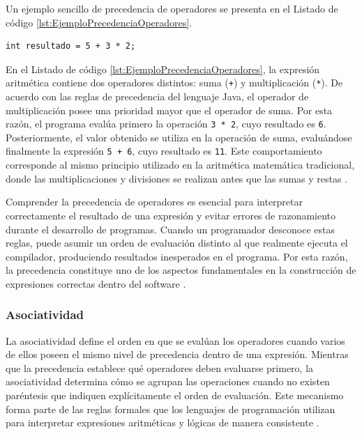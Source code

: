 \documentclass[12pt,twoside]{book}
\begin{document}
						Un ejemplo sencillo de precedencia de operadores se presenta en el Listado de código \ref{lst:EjemploPrecedenciaOperadores}.
						
						\begin{lstlisting}[style=Java,caption={Evaluación de una expresión considerando la precedencia de operadores.},label={lst:EjemploPrecedenciaOperadores}]
	int resultado = 5 + 3 * 2; \end{lstlisting}
						
						\noindent
						En el Listado de código \ref{lst:EjemploPrecedenciaOperadores}, la expresión aritmética contiene dos operadores distintos: suma (\texttt{+}) y multiplicación (\texttt{*}). De acuerdo con las reglas de precedencia del lenguaje Java, el operador de multiplicación posee una prioridad mayor que el operador de suma. Por esta razón, el programa evalúa primero la operación \texttt{3 * 2}, cuyo resultado es \texttt{6}. Posteriormente, el valor obtenido se utiliza en la operación de suma, evaluándose finalmente la expresión \texttt{5 + 6}, cuyo resultado es \texttt{11}. Este comportamiento corresponde al mismo principio utilizado en la aritmética matemática tradicional, donde las multiplicaciones y divisiones se realizan antes que las sumas y restas \cite{Sebesta2018Concepts}.
						
						Comprender la precedencia de operadores es esencial para interpretar correctamente el resultado de una expresión y evitar errores de razonamiento durante el desarrollo de programas. Cuando un programador desconoce estas reglas, puede asumir un orden de evaluación distinto al que realmente ejecuta el compilador, produciendo resultados inesperados en el programa. Por esta razón, la precedencia constituye uno de los aspectos fundamentales en la construcción de expresiones correctas dentro del software \cite{Pressman2019Software,Sommerville2015Software}.
						
					\subsubsection{Asociatividad}
						\noindent
						La asociatividad define el orden en que se evalúan los operadores cuando varios de ellos poseen el mismo nivel de precedencia dentro de una expresión. Mientras que la precedencia establece qué operadores deben evaluarse primero, la asociatividad determina cómo se agrupan las operaciones cuando no existen paréntesis que indiquen explícitamente el orden de evaluación. Este mecanismo forma parte de las reglas formales que los lenguajes de programación utilizan para interpretar expresiones aritméticas y lógicas de manera consistente \cite{Sebesta2018Concepts,Pierce2002Types}.
						
\end{document}
